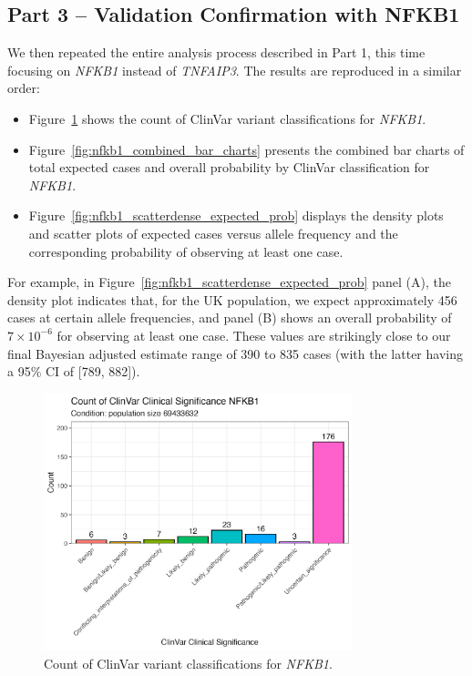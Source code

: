 \documentclass[a4paper,12pt]{article}
\begin{document}
\subsection{Part 3 -- Validation Confirmation with NFKB1}
We then repeated the entire analysis process described in Part 1, this time focusing on \textit{NFKB1} instead of \textit{TNFAIP3}. The results are reproduced in a similar order:
\begin{itemize}
    \item Figure~\ref{fig:nfkb1_clinvar_count} shows the count of ClinVar variant classifications for \textit{NFKB1}.
    \item Figure~\ref{fig:nfkb1_combined_bar_charts} presents the combined bar charts of total expected cases and overall probability by ClinVar classification for \textit{NFKB1}.
    \item Figure~\ref{fig:nfkb1_scatterdense_expected_prob} displays the density plots and scatter plots of expected cases versus allele frequency and the corresponding probability of observing at least one case.
\end{itemize}
For example, in Figure~\ref{fig:nfkb1_scatterdense_expected_prob} panel (A), the density plot indicates that, for the UK population, we expect approximately 456 cases at certain allele frequencies, and panel (B) shows an overall probability of \(7 \times 10^{-6}\) for observing at least one case. These values are strikingly close to our final Bayesian adjusted estimate range of 390 to 835 cases (with the latter having a 95\% CI of [789, 882]).

\begin{figure}[H]
  \centering
  \includegraphics[width=0.8\textwidth]{../images/nfkb1_clinvar_count.png}
  \caption{Count of ClinVar variant classifications for \textit{NFKB1}.}
  \label{fig:nfkb1_clinvar_count}
\end{figure}
\end{document}
